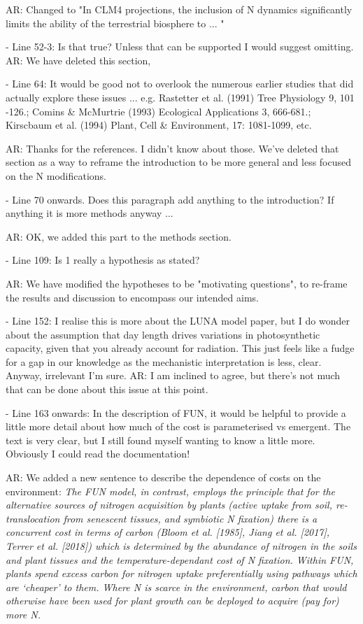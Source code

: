 \documentclass{article}
\begin{document}
\textsf{AR: Changed to "In CLM4 projections, the inclusion of N dynamics significantly limits the ability of the terrestrial biosphere to ... "}

- Line 52-3: Is that true? Unless that can be supported I would suggest omitting. 
\textsf{AR: We have deleted this section,}

- Line 64: It would be good not to overlook the numerous earlier studies that did actually explore these issues ... e.g. Rastetter et al. (1991) Tree Physiology 9, 101 -126.; Comins \& McMurtrie (1993) Ecological Applications 3, 666-681.; Kirscbaum et al. (1994) Plant, Cell \& Environment, 17: 1081-1099, etc. 

\textsf{AR: Thanks for the references. I didn't know about those. We've deleted that section as a way to reframe the introduction to be more general and less focused on the N modifications.}

- Line 70 onwards. Does this paragraph add anything to the introduction? If anything it is more methods anyway ... 

\textsf{AR: OK, we added this part to the methods section. }

- Line 109: Is 1 really a hypothesis as stated? 

\textsf{AR: We have modified the hypotheses to be "motivating questions", to re-frame the results and discussion to encompass our intended aims.}

- Line 152: I realise this is more about the LUNA model paper, but I do wonder about the assumption that day length drives variations in photosynthetic capacity, given that you already account for radiation. This just feels like a fudge for a gap in our knowledge as the mechanistic interpretation is less, clear. Anyway, irrelevant I'm sure. 
\textsf{AR: I am inclined to agree, but there's not much that can be done about this issue at this point.} 

- Line 163 onwards: In the description of FUN, it would be helpful to provide a little more detail about how much of the cost is parameterised vs emergent. The text is very clear, but I still found myself wanting to know a little more. Obviously I could read the documentation! 

\textsf{AR: We added a new sentence to describe the dependence of costs on the environment: \emph{The FUN model, in contrast, employs the principle that for the alternative sources of nitrogen acquisition by plants (active uptake from soil, re-translocation from senescent tissues, and symbiotic N fixation) there is a concurrent cost in terms of carbon (Bloom et al. [1985], Jiang et al. [2017], Terrer et al. [2018]) which is determined by the abundance of nitrogen in the soils and plant tissues and the temperature-dependant cost of N fixation. Within FUN, plants spend excess carbon for nitrogen uptake preferentially using pathways which are `cheaper' to them. Where N is scarce in the environment, carbon that would otherwise have been used for plant growth can be deployed to acquire (pay for) more N. }}
\end{document}
